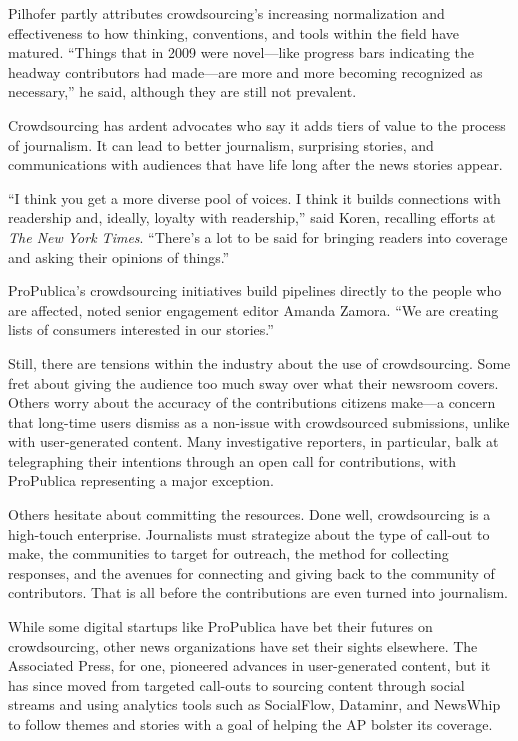 \documentclass[notoc, symmetric, nobib, nols]{towcenter-guideto-book}
\begin{document}
Pilhofer partly attributes crowdsourcing's increasing normalization and effectiveness to how thinking, conventions, and tools within the field have matured. ``Things that in 2009 were novel---like progress bars indicating the headway contributors had made---are more and more becoming recognized as necessary,'' he said, although they are still not prevalent.

Crowdsourcing has ardent advocates who say it adds tiers of value to the process of journalism. It can lead to better journalism, surprising stories, and communications with audiences that have life long after the news stories appear.

``I think you get a more diverse pool of voices. I think it builds connections with readership and, ideally, loyalty with readership,'' said Koren, recalling efforts at \textit{The New York Times}. ``There's a lot to be said for bringing readers into coverage and asking their opinions of things.''%

ProPublica's crowdsourcing initiatives build pipelines directly to the people who are affected, noted senior engagement editor Amanda Zamora. ``We are creating lists of consumers interested in our stories.''%

Still, there are tensions within the industry about the use of crowdsourcing. Some fret about giving the audience too much sway over what their newsroom covers. Others worry about the accuracy of the contributions citizens make---a concern that long-time users dismiss as a non-issue with crowdsourced submissions, unlike with user-generated content. Many investigative reporters, in particular, balk at telegraphing their intentions through an open call for contributions, with ProPublica representing a major exception.

Others hesitate about committing the resources. Done well, crowdsourcing is a high-touch enterprise. Journalists must strategize about the type of call-out to make, the communities to target for outreach, the method for collecting responses, and the avenues for connecting and giving back to the community of contributors. That is all before the contributions are even turned into journalism.  

While some digital startups like ProPublica have bet their futures on crowdsourcing, other news organizations have set their sights elsewhere. The Associated Press, for one, pioneered advances in user-generated content, but it has since moved from targeted call-outs to sourcing content through social streams and using analytics tools such as SocialFlow, Dataminr, and NewsWhip to follow themes and stories with a goal of helping the AP bolster its coverage. 
\end{document}
